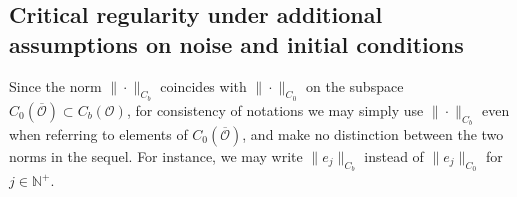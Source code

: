 \documentclass[10pt]{article}
\numberwithin{figure}{section}
\numberwithin{equation}{section}
\newtheorem{proposition}[theorem]{Proposition}
\newcommand{\cO}{{\mathcal O}}
\newcommand{\0}{{\theta}}
\def\be{\begin{equation}}
\def\ee{\end{equation}}
\def\Hs{\hspace{1cm}}\def\hs{\hspace{0.5cm}}
\def\Vs{\vskip8pt}\def\vs{\vskip4pt}
\begin{document}












\subsection{Critical regularity under additional assumptions on noise and initial conditions}
Since the norm $\|\cdot\|_{C_b}$ coincides with $\|\cdot\|_{C_0}$ on the subspace $C_0(\overline{\mathcal{O}})\subset C_b(\cO)$, for consistency of notations we may simply use $\|\cdot\|_{C_b}$ even when referring to elements of $C_0(\overline{\mathcal{O}})$, and make no distinction between the two norms in the sequel. For instance, we may write $\|e_j\|_{C_b}$ instead of $\|e_j\|_{C_0}$ for $j\in\mathbb{N}^+$.
\vs
\end{document}
